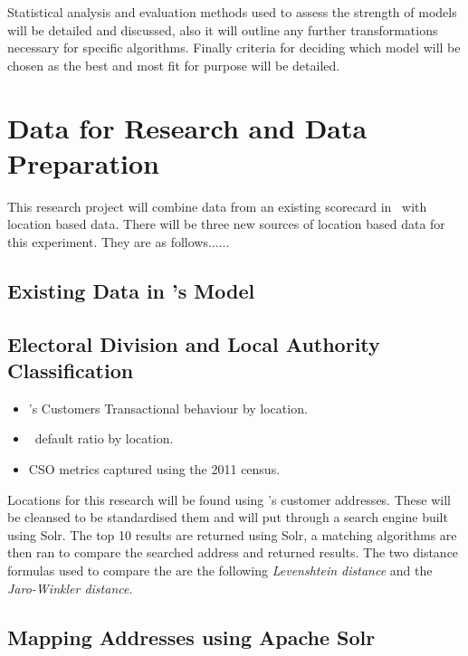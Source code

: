 Statistical analysis and evaluation methods used to assess the strength of models will be detailed and discussed, also it will outline any further transformations necessary for specific algorithms. Finally criteria for deciding which model will be chosen as the best and most fit for purpose will be detailed.

\section{Data for Research and Data Preparation}
This research project will combine data from an existing scorecard in \subjectname\ with location based data. There will be three new sources of location based data for this experiment. They are as follows......

\subsection{Existing Data in \subjectname's Model}

\subsection{Electoral Division and Local Authority Classification}
\begin{itemize}
	\item \subjectname's Customers Transactional behaviour by location.
	\item \subjectname\ default ratio by location.
	\item CSO metrics captured using the 2011 census. 
\end{itemize}

Locations for this research will be found using \subjectname's customer addresses. These will be cleansed to be standardised them and will put through a search engine built using Solr. The top 10 results are returned using Solr, a matching algorithms are then ran to compare the searched address and returned results. The two distance formulas used to compare the are the following \textit{Levenshtein distance} and the \textit{Jaro-Winkler distance}.

\subsection{Mapping Addresses using Apache Solr}


